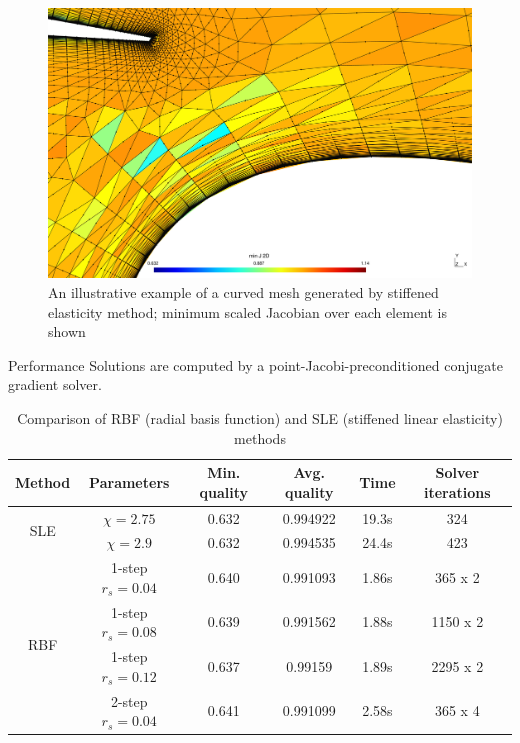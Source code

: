 \documentclass[t,12pt]{beamer}
\begin{document}
\begin{frame}
\begin{figure}
	\centering
	\includegraphics[scale=0.2]{3comp-stiffelast-zoomed}
	\caption{An illustrative example of a curved mesh generated by stiffened elasticity method; minimum scaled Jacobian over each element is shown}
	\label{fig:3compstiffelast}
\end{figure}
\end{frame}

\begin{frame}{Performance}
	\fontsize{8pt}{10}\selectfont
	Solutions are computed by a point-Jacobi-preconditioned conjugate gradient solver.
	\begin{table}
		\begin{tabular}{|c|c|c|c|c|c|}
			\hline
			Method & Parameters & Min. quality & Avg. quality & Time & Solver iterations \\
			\hline
			\multirow{2}{0.5in}{SLE} & $\chi=2.75$ & 0.632 & 0.994922 & 19.3s & 324 \\
			& $\chi=2.9$ & 0.632 & 0.994535 & 24.4s & 423 \\
			\hline
			\multirow{4}{0.5in}{RBF} & 1-step $r_s=0.04$ & 0.640 & 0.991093 & 1.86s & 365 x 2 \\
			&   1-step $r_s=0.08$ & 0.639 & 0.991562 & 1.88s & 1150 x 2\\
			&   1-step $r_s=0.12$ & 0.637 & 0.99159  & 1.89s & 2295 x 2 \\
			&   2-step $r_s=0.04$ & 0.641 & 0.991099 & 2.58s & 365 x 4\\
			\hline
		\end{tabular}
		\caption{Comparison of RBF (radial basis function) and SLE (stiffened linear elasticity) methods}
		\label{tab:rbfelast}
	\end{table}
\end{frame}
\end{document}
